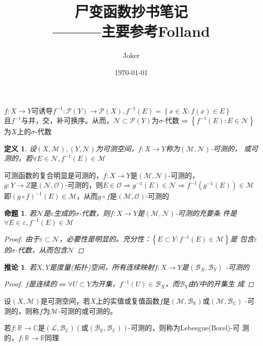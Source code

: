 \documentclass[12pt, a4paper, oneside]{ctexbook}
\title{{\Huge{\textbf{尸变函数抄书笔记}}}\\———主要参考Folland}
\author{Joker}
\date{\today}
\newtheorem{definition}[theorem]{定义}
\newtheorem{corollary}[theorem]{推论}
\newtheorem{proposition}[theorem]{命题}
\begin{document}
$f:X\to Y$可诱导$f^{-1}:\mathcal{P}(Y)\to\mathcal{P}(X),f^{-1}(E)=\left\{x\in X:f(x)\in E\right\}$\\
且$f^{-1}$与并，交，补可换序。从而，$\mathcal{N}\subset\mathcal{P}(Y)$为$\sigma$-代数$\Rightarrow\left\{f^{-1}(E):E\in\mathcal{N}\right\}$
为$X$上的$\sigma$-代数
\begin{definition}
    设$(X,\mathcal{M}),(Y,\mathcal{N})$为可测空间，$f:X\to Y$称为$(\mathcal{M},\mathcal{N})$-可测的，
    或可测的，若$\forall E\in\mathcal{N},f^{-1}(E)\in\mathcal{M}$
\end{definition}
可测函数的复合明显是可测的，$f:X\to Y$是$(\mathcal{M},\mathcal{N})$-可测的，\\
$g:Y\to Z$是$(\mathcal{N},\mathcal{O})$-可测的，则$E\in\mathcal{O}\Rightarrow g^{-1}(E)\in\mathcal{N}\Rightarrow f^{-1}(g^{-1}(E))\in\mathcal{M}$\\
即$(g\circ f)^{-1}(E)\in\mathcal{M}$，从而$g\circ f$是$(\mathcal{M},\mathcal{O})$-可测的
\begin{proposition}
    若$\mathcal{N}$是$\varepsilon$生成的$\sigma$-代数，则$f:X\to Y$是$(\mathcal{M},\mathcal{N})$-可测的充要条
    件是$\forall E\in\varepsilon,f^{-1}(E)\in\mathcal{M}$
    \begin{proof}
        由于$\varepsilon\subset\mathcal{N}$，必要性是明显的。充分性：$\left\{E\subset Y:f^{-1}(E)\in\mathcal{M}\right\}$是
        包含$\varepsilon$的$\sigma$-代数，从而包含$\mathcal{N}$
    \end{proof}
\end{proposition}
\begin{corollary}
    若$X,Y$是度量(拓扑)空间，所有连续映射$f:X\to Y$是$(\mathcal{B}_{X},\mathcal{B}_{Y})$
    -可测的
    \begin{proof}
        $f$是连续的$\Leftrightarrow\forall U\subset Y$为开集，$f^{-1}(U)\in\mathcal{B}_X$，而$\mathcal{B}_Y$由$Y$中的开集生
        成
    \end{proof}
\end{corollary}
设$(X,\mathcal{M})$是可测空间，若$X$上的实值或复值函数$f$是$(\mathcal{M},\mathcal{B}_{\mathbb{R}})$或$(\mathcal{M},\mathcal{B}_{\mathbb{C}})$
-可测的，则称$f$为$\mathcal{M}$-可测的或可测的。

若$f:\mathbb{R}\to\mathbb{C}$是$(\mathcal{L},\mathcal{B}_{\mathbb{C}})(\text{或}(\mathcal{B}_{\mathbb{R}},\mathcal{B}_{\mathbb{C}}))$-可测的，则称为Lebesgue(Borel)-可
测的，$f:\mathbb{R}\to\mathbb{R}$同理
\end{document}
